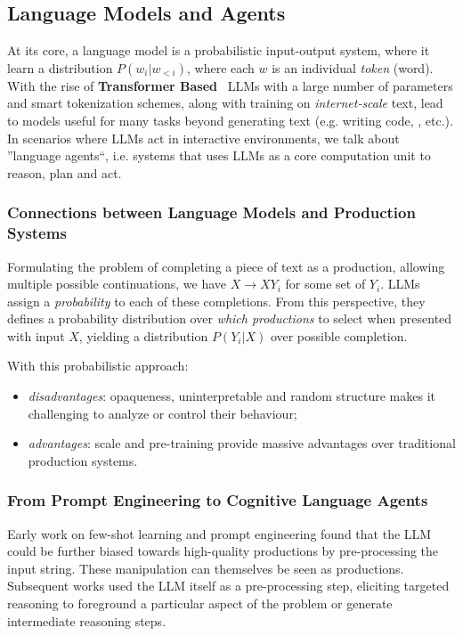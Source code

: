 \subsection{Language Models and Agents}
At its core, a language model is a probabilistic input-output system, where it
learn a distribution $P(w_i|w_{<i})$, where each $w$ is an individual
\emph{token} (word). With the rise of \textbf{Transformer
Based}~\cite{vaswani2023attentionneed} \ac{LLM}s with a large number of
parameters and smart tokenization schemes, along with training on
\emph{internet-scale} text, lead to models useful for many tasks beyond
generating text (e.g. writing code, , etc.). In scenarios where \ac{LLM}s act
in interactive environments, we talk about ''language agents``, i.e. systems
that uses \ac{LLM}s as a core computation unit to reason, plan and act.

\subsubsection{Connections between Language Models and Production Systems}
Formulating the problem of completing a piece of text as a production, allowing
multiple possible continuations, we have $X \rightarrow XY_i$ for some set of
$Y_i$. \ac{LLM}s assign a \emph{probability} to each of these completions.
From this perspective, they defines a probability distribution over \emph{which
productions} to select when presented with input $X$, yielding a distribution
$P(Y_i|X)$ over possible completion.

With this probabilistic approach:
\begin{itemize}
    \item \emph{disadvantages}: opaqueness, uninterpretable and random
        structure makes it challenging to analyze or control their behaviour;
    \item \emph{advantages}: scale and pre-training provide massive advantages
        over traditional production systems.
\end{itemize}

\subsubsection{From Prompt Engineering to Cognitive Language Agents}
Early work on few-shot learning and prompt engineering found that the \ac{LLM}
could be further biased towards high-quality productions by pre-processing the
input string. These manipulation can themselves be seen as productions.
Subsequent works used the \ac{LLM} itself as a pre-processing step, eliciting
targeted reasoning to foreground a particular aspect of the problem or generate
intermediate reasoning steps.

